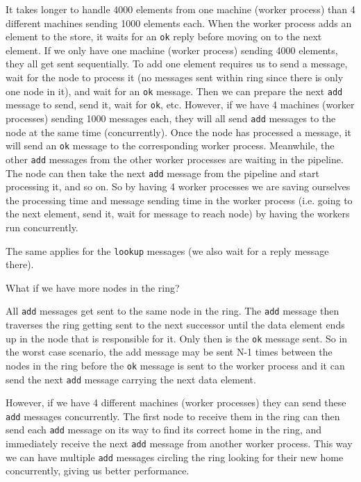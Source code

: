 \documentclass[a4paper, 11pt]{article}
\begin{document}
It takes longer to handle 4000 elements from one machine (worker process) than 4 different machines sending 1000 elements each.
When the worker process adds an element to the store, it waits for an \texttt{ok} reply before moving on to the next element. If we only have one machine (worker process) sending 4000 elements, they all get sent sequentially.
To add one element requires us to send a message, wait for the node to process it (no messages sent within ring since there is only one node in it), and wait for an \texttt{ok} message. Then we can prepare the next \texttt{add} message to send, send it, wait for \texttt{ok}, etc.
However, if we have 4 machines (worker processes) sending 1000 messages each, they will all send \texttt{add} messages to the node at the same time (concurrently). Once the node has processed a message, it will send an \texttt{ok} message to the corresponding worker process. Meanwhile, the other \texttt{add} messages from the other worker processes are waiting in the pipeline. The node can then take the next \texttt{add} message from the pipeline and start processing it, and so on.
So by having 4 worker processes we are saving ourselves the processing time and message sending time in the worker process (i.e. going to the next element, send it, wait for message to reach node) by having the workers run concurrently. 

The same applies for the \texttt{lookup} messages (we also wait for a reply message there).

What if we have more nodes in the ring?

All \texttt{add} messages get sent to the same node in the ring. The \texttt{add} message then traverses the ring getting sent to the next successor until the data element ends up in the node that is responsible for it. Only then is the \texttt{ok} message sent. So in the worst case scenario, the add message may be sent N-1 times between the nodes in the ring before the \texttt{ok} message is sent to the worker process and it can send the next \texttt{add} message carrying the next data element.

However, if we have 4 different machines (worker processes) they can send these \texttt{add} messages concurrently. The first node to receive them in the ring can then send each \texttt{add} message on its way to find its correct home in the ring, and immediately receive the next \texttt{add} message from another worker process. This way we can have multiple \texttt{add} messages circling the ring looking for their new home concurrently, giving us better performance.
\end{document}

